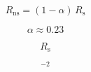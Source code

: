\documentclass[preview,border=2pt]{standalone}
\begin{document}
\[
R_\mathrm{ns} = (1-\alpha)\,R_\mathrm{s}
\]

\[
\alpha\approx 0.23
\]

\[
R_\mathrm{s}
\]

\[
^{-2}
\]
\end{document}
